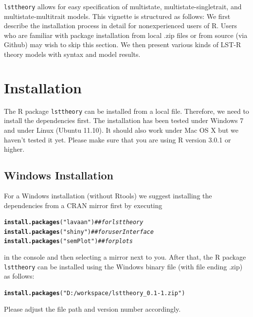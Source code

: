 \documentclass[10pt]{article}\usepackage[]{graphicx}\usepackage[]{xcolor}
\makeatletter
\newcommand{\hlstr}[1]{\textcolor[rgb]{0.192,0.494,0.8}{#1}}%
\newcommand{\hlcom}[1]{\textcolor[rgb]{0.678,0.584,0.686}{\textit{#1}}}%
\newcommand{\hlstd}[1]{\textcolor[rgb]{0.345,0.345,0.345}{#1}}%
\newcommand{\hlkwd}[1]{\textcolor[rgb]{0.737,0.353,0.396}{\textbf{#1}}}%
\newenvironment{kframe}{%
 \def\at@end@of@kframe{}%
 \ifinner\ifhmode%
  \def\at@end@of@kframe{\end{minipage}}%
  \begin{minipage}{\columnwidth}%
 \fi\fi%
 \def\FrameCommand##1{\hskip\@totalleftmargin \hskip-\fboxsep
 \colorbox{shadecolor}{##1}\hskip-\fboxsep
     \hskip-\linewidth \hskip-\@totalleftmargin \hskip\columnwidth}%
 \MakeFramed {\advance\hsize-\width
   \@totalleftmargin\z@ \linewidth\hsize
   \@setminipage}}%
 {\par\unskip\endMakeFramed%
 \at@end@of@kframe}
\newenvironment{knitrout}{}{} %
\makeatother
\begin{document}
\texttt{lsttheory} allows for easy specification of multistate, multistate-singletrait, and multistate-multitrait models. This vignette is structured as follows: We first describe the installation process in detail for nonexperienced users of \textsf{R}. Users who are familiar with package installation from local .zip files or from source (via Github) may wish to skip this section. We then present various kinds of LST-R theory models with syntax and model results.



\section{Installation}

The \textsf{R} package \texttt{lsttheory} can be installed from a local file. Therefore, we need to install the dependencies first. The installation has been tested under Windows 7 and under Linux (Ubuntu 11.10). It should also work under Mac OS X but we haven't tested it yet. Please make sure that you are using R version 3.0.1 or higher.

\subsection{Windows Installation}

For a Windows installation (without Rtools) we suggest installing the dependencies from a CRAN mirror first by executing
%
\begin{knitrout}
\color{fgcolor}\begin{kframe}
\begin{alltt}
\hlkwd{install.packages}\hlstd{(}\hlstr{"lavaan"}\hlstd{)}  \hlcom{## for lsttheory}
\hlkwd{install.packages}\hlstd{(}\hlstr{"shiny"}\hlstd{)}  \hlcom{## for user Interface}
\hlkwd{install.packages}\hlstd{(}\hlstr{"semPlot"}\hlstd{)}  \hlcom{## for plots}
\end{alltt}
\end{kframe}
\end{knitrout}
%
in the console and then selecting a mirror next to you. After that, the \textsf{R} package \texttt{lsttheory} can be installed using the Windows binary file (with file ending .zip) as follows:
%
\begin{knitrout}
\color{fgcolor}\begin{kframe}
\begin{alltt}
\hlkwd{install.packages}\hlstd{(}\hlstr{"D:/workspace/lsttheory_0.1-1.zip"}\hlstd{)}
\end{alltt}
\end{kframe}
\end{knitrout}
%
Please adjust the file path and version number accordingly. 
\end{document}
